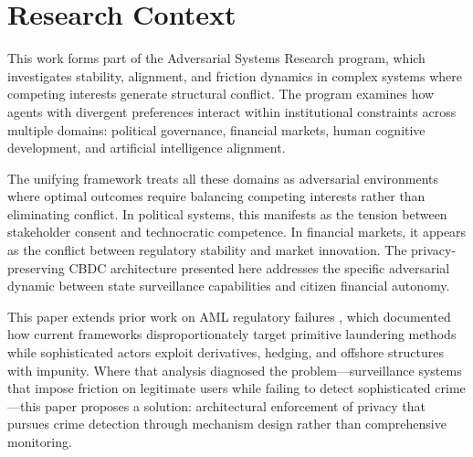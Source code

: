 \documentclass[11pt]{article}
\begin{document}
\begin{abstract}
\vspace{0.5em}
\noindent\textbf{Keywords:} central bank digital currency, privacy, financial surveillance, anti-money laundering, zero-knowledge proofs, digital currency architecture, transaction monitoring, opt-in deanonymization

\vspace{0.3em}
\noindent\textbf{JEL Codes:} E42 (Monetary Systems), E58 (Central Banks and Their Policies), G28 (Government Policy and Regulation), K42 (Illegal Behavior and Enforcement of Law), O33 (Technological Change)
\end{abstract}

\vspace{1em}

\section*{Research Context}

This work forms part of the Adversarial Systems Research program, which investigates stability, alignment, and friction dynamics in complex systems where competing interests generate structural conflict. The program examines how agents with divergent preferences interact within institutional constraints across multiple domains: political governance, financial markets, human cognitive development, and artificial intelligence alignment.

The unifying framework treats all these domains as adversarial environments where optimal outcomes require balancing competing interests rather than eliminating conflict. In political systems, this manifests as the tension between stakeholder consent and technocratic competence. In financial markets, it appears as the conflict between regulatory stability and market innovation. The privacy-preserving CBDC architecture presented here addresses the specific adversarial dynamic between state surveillance capabilities and citizen financial autonomy.

This paper extends prior work on AML regulatory failures \citep{farzulla2025hedging}, which documented how current frameworks disproportionately target primitive laundering methods while sophisticated actors exploit derivatives, hedging, and offshore structures with impunity. Where that analysis diagnosed the problem---surveillance systems that impose friction on legitimate users while failing to detect sophisticated crime---this paper proposes a solution: architectural enforcement of privacy that pursues crime detection through mechanism design rather than comprehensive monitoring.
\end{document}

